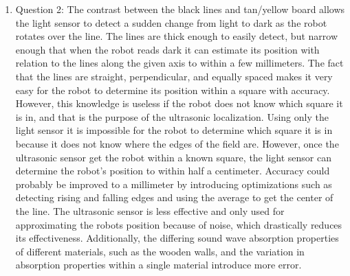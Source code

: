 \documentclass[twocolumn]{article}
\begin{document}
\begin{enumerate}
\item
Question 2:
The contrast between the black lines and tan/yellow board allows the light sensor to detect a sudden change from light to dark as the robot rotates over the line. The lines are thick enough to easily detect, but narrow enough that when the robot reads dark it can estimate its position with relation to the lines along the given axis to within a few millimeters. The fact that the lines are straight, perpendicular, and equally spaced makes it very easy for the robot to determine its position within a square with accuracy. However, this knowledge is useless if the robot does not know which square it is in, and that is the purpose of the ultrasonic localization. Using only the light sensor it is impossible for the robot to determine which square it is in because it does not know where the edges of the field are. However, once the ultrasonic sensor get the robot within a known square, the light sensor can determine the robot’s position to within half a centimeter. Accuracy could probably be improved to a millimeter by introducing optimizations such as detecting rising and falling edges and using the average to get the center of the line. The ultrasonic sensor is less effective and only used for approximating the robots position because of noise, which drastically reduces its effectiveness. Additionally, the differing sound wave absorption properties of different materials, such as the wooden walls, and the variation in absorption properties within a single material introduce more error.


\end{enumerate}
\end{document}
